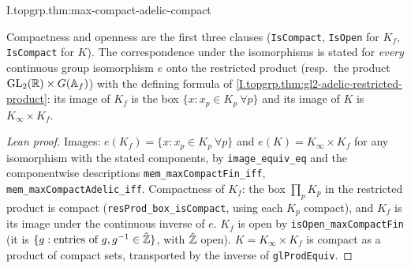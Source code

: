 \begin{theorem}
\end{theorem}
\begin{tfformal}{I.topgrp.thm:max-compact-adelic-compact}
\begin{tffidelity}
Compactness and openness are the first three clauses (\texttt{IsCompact}, \texttt{IsOpen} for $K_f$, \texttt{IsCompact} for $K$). The correspondence under the isomorphisms is stated for \emph{every} continuous group isomorphism $e$ onto the restricted product (resp.\ the product $\mathrm{GL}_2(\mathbb{R})\times G(\mathbb{A}_f)$) with the defining formula of \cref{I.topgrp.thm:gl2-adelic-restricted-product}: its image of $K_f$ is the box $\{x:x_p\in K_p\ \forall p\}$ and its image of $K$ is $K_\infty\times K_f$.
\end{tffidelity}
\end{tfformal}
\begin{proof}[Lean proof]
Images: $e(K_f)=\{x:x_p\in K_p\ \forall p\}$ and $e(K)=K_\infty\times K_f$ for any isomorphism with the stated components, by \texttt{image\_equiv\_eq} and the componentwise descriptions \texttt{mem\_maxCompactFin\_iff}, \texttt{mem\_maxCompactAdelic\_iff}. Compactness of $K_f$: the box $\prod_pK_p$ in the restricted product is compact (\texttt{resProd\_box\_isCompact}, using each $K_p$ compact), and $K_f$ is its image under the continuous inverse of $e$. $K_f$ is open by \texttt{isOpen\_maxCompactFin} (it is $\{g:\text{entries of }g,g^{-1}\in\hat{\mathbb{Z}}\}$, with $\hat{\mathbb{Z}}$ open). $K=K_\infty\times K_f$ is compact as a product of compact sets, transported by the inverse of \texttt{glProdEquiv}.
\end{proof}

